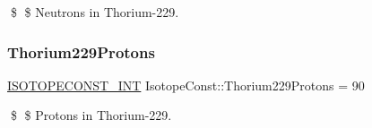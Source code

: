\$ \$ Neutrons in Thorium-\/229. \mbox{\label{group___isotope_const-_thorium-_th229_gaa3caf9fdee3622fb33305113cd5ff133}} 
\subsubsection{\texorpdfstring{Thorium229\+Protons}{Thorium229Protons}}
{\footnotesize\ttfamily \mbox{\hyperlink{group___isotope_const-_macros_ga5f18360b3e99483a35c32d789e62621c}{I\+S\+O\+T\+O\+P\+E\+C\+O\+N\+S\+T\+\_\+\+I\+NT}} Isotope\+Const\+::\+Thorium229\+Protons = 90}

\$ \$ Protons in Thorium-\/229. 